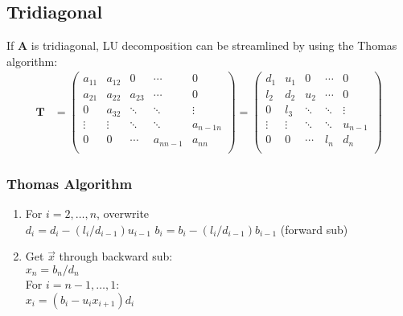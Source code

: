 \documentclass[12pt]{article}
\newcommand{\ve}[1]{\ensuremath{\mathbf{#1}}}
\begin{document}
\subsection*{Tridiagonal}
If $\ve{A}$ is tridiagonal, LU decomposition can be streamlined by using the Thomas algorithm:
%
\begin{align}
    \ve{T} &= \begin{pmatrix}
      a_{11} & a_{12} & 0      & \cdots    & 0 \\
      a_{21} & a_{22} & a_{23} & \cdots    & 0 \\
      0      & a_{32} & \ddots & \ddots    & \vdots \\     
      \vdots & \vdots & \ddots & \ddots    & a_{n-1 n}\\
      0      & 0      & \cdots & a_{n n-1} & a_{nn} \\
    \end{pmatrix} =
    \begin{pmatrix}
      d_{1}  & u_{1}  & 0      & \cdots & 0 \\
      l_{2}  & d_{2}  & u_{2}  & \cdots & 0 \\
      0      & l_{3}  & \ddots & \ddots & \vdots \\     
      \vdots & \vdots & \ddots & \ddots & u_{n-1}\\
      0      & 0      & \cdots & l_{n}  & d_{n} \\
    \end{pmatrix} \nonumber   
\end{align} 

\subsubsection*{Thomas Algorithm}
\begin{enumerate}
\item For $i=2, \dots, n$, overwrite\\
  \hspace*{1 em} $d_i = d_i - (l_i / d_{i-1}) u_{i-1}$
  \hspace*{1 em} $b_i = b_i - (l_i / d_{i-1}) b_{i-1}$ (forward sub)

\item Get $\vec{x}$ through backward sub:\\
$x_n = b_n / d_n$\\
For $i = n-1, \dots, 1$:\\
  \hspace*{1 em} $x_i = (b_i - u_i x_{i+1}) d_i$
\end{enumerate}



 
\end{document}

